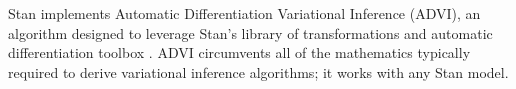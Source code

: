 Stan implements Automatic Differentiation Variational Inference (ADVI), an
algorithm designed to leverage Stan's library of transformations and automatic
differentiation toolbox \citep{Kucukelbir:2015}. ADVI circumvents all of the
mathematics typically required to derive variational inference algorithms; it
works with any Stan model.



